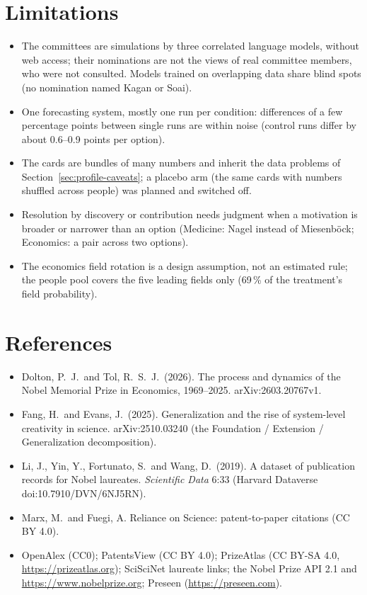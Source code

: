 \documentclass[11pt,a4paper]{article}
\begin{document}
\section{Limitations}\label{sec:limitations}

\begin{itemize}
\item The committees are simulations by three correlated language models, without web access; their nominations are
  not the views of real committee members, who were not consulted. Models trained on overlapping data share blind
  spots (no nomination named Kagan or Soai).
\item One forecasting system, mostly one run per condition: differences of a few percentage points between single runs
  are within noise (control runs differ by about 0.6--0.9 points per option).
\item The cards are bundles of many numbers and inherit the data problems of Section~\ref{sec:profile-caveats}; a
  placebo arm (the same cards with numbers shuffled across people) was planned and switched off.
\item Resolution by discovery or contribution needs judgment when a motivation is broader or narrower than an option
  (Medicine: Nagel instead of Miesenböck; Economics: a pair across two options).
\item The economics field rotation is a design assumption, not an estimated rule; the people pool covers the five
  leading fields only (69\,\% of the treatment's field probability).
\end{itemize}

\section*{References}
\begin{itemize}
\item Dolton, P.\ J.\ and Tol, R.\ S.\ J.\ (2026). The process and dynamics of the Nobel Memorial Prize in Economics,
  1969--2025. arXiv:2603.20767v1.
\item Fang, H.\ and Evans, J.\ (2025). Generalization and the rise of system-level creativity in science.
  arXiv:2510.03240 (the Foundation / Extension / Generalization decomposition).
\item Li, J., Yin, Y., Fortunato, S.\ and Wang, D.\ (2019). A dataset of publication records for Nobel laureates.
  \emph{Scientific Data} 6:33 (Harvard Dataverse doi:10.7910/DVN/6NJ5RN).
\item Marx, M.\ and Fuegi, A. Reliance on Science: patent-to-paper citations (CC BY 4.0).
\item OpenAlex (CC0); PatentsView (CC BY 4.0); PrizeAtlas (CC BY-SA 4.0, \url{https://prizeatlas.org}); SciSciNet
  laureate links; the Nobel Prize API 2.1 and \url{https://www.nobelprize.org}; Preseen (\url{https://preseen.com}).
\end{itemize}
\end{document}
